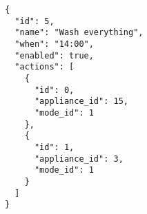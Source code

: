 \begin{lstlisting}[language=numbered,caption={Example of a routine with two actions},label=code:routine_wash_everything,float,floatplacement=H]
{
  "id": 5,
  "name": "Wash everything",
  "when": "14:00",
  "enabled": true,
  "actions": [
    {
      "id": 0,
      "appliance_id": 15,
      "mode_id": 1
    },
    {
      "id": 1,
      "appliance_id": 3,
      "mode_id": 1
    }
  ]
}
\end{lstlisting}